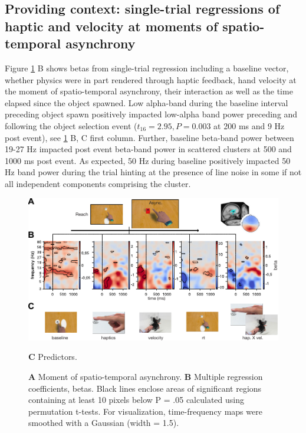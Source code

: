 \subsection{Providing context: single-trial regressions of haptic and velocity at moments of spatio-temporal asynchrony}
Figure \ref{st_ersp} B shows betas from single-trial regression including a baseline vector, whether physics were in part rendered through haptic feedback, hand velocity at the moment of spatio-temporal asynchrony, their interaction as well as the time elapsed since the object spawned. Low alpha-band during the baseline interval preceding object spawn positively impacted low-alpha band power preceding and following the object selection event ($t_{16} = 2.95, P = 0.003$ at 200 ms and 9 Hz post event), see \ref{st_ersp} B, C first column. Further, baseline beta-band power between 19-27 Hz impacted post event beta-band power in scattered clusters at 500 and 1000 ms post event. As expected, 50 Hz during baseline positively impacted 50 Hz band power during the trial hinting at the presence of line noise in some if not all independent components comprising the cluster.
\begin{figure}[t]
  \includegraphics[width=\textwidth]{figures/fig4_ersp_single_trial_short.pdf}
  \caption{\textbf{A} Moment of spatio-temporal asynchrony. \textbf{B} Multiple regression coefficients, betas. Black lines enclose areas of significant regions containing at least 10 pixels below P = .05 calculated using permutation t-tests. For visualization, time-frequency maps were smoothed with a Gaussian (width = 1.5).} \textbf{C} Predictors.
  \label{st_ersp}  
\end{figure}
